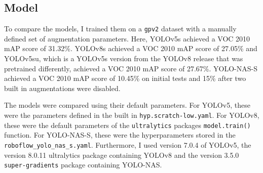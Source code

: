 \documentclass[10pt]{book}
\begin{document}
\subsection{Model}


To compare the models, I trained them on a \texttt{gpv2} dataset with a manually defined set of augmentation parameters. Here, \ac{YOLO}v5s achieved a VOC 2010 \ac{mAP} score of 31.32\%. \ac{YOLO}v8s achieved a VOC 2010 \ac{mAP} score of 27.05\% and \ac{YOLO}v5su, which is a \ac{YOLO}v5s version from the \ac{YOLO}v8 release that was pretrained differently, achieved a VOC 2010 \ac{mAP} score of 27.67\%. \ac{YOLO}-NAS-S achieved a VOC 2010 \ac{mAP} score of 10.45\% on initial tests and 15\% after two built in augmentations were disabled.

The models were compared using their default parameters. For \ac{YOLO}v5, these were the parameters defined in the built in \texttt{hyp.scratch-low.yaml}. For \ac{YOLO}v8, these were the default parameters of the \texttt{ultralytics} packages \texttt{model.train()} function. For \ac{YOLO}-NAS-S, these were the hyperparameters stored in the \texttt{roboflow\_yolo\_nas\_s.yaml}. Furthermore, I used version 7.0.4 of \ac{YOLO}v5, the version 8.0.11 ultralytics package containing \ac{YOLO}v8 and the version 3.5.0 \texttt{super-gradients} package containing \ac{YOLO}-NAS.

\end{document}

